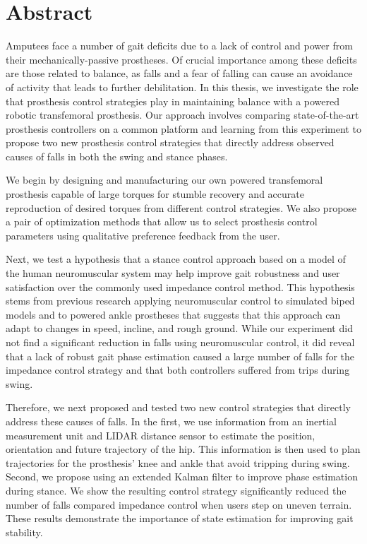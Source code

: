 \chapter*{Abstract}

Amputees face a number of gait deficits due to a lack of control and power from
their mechanically-passive prostheses. Of crucial importance among these
deficits are those related to balance, as falls and a fear of falling can cause
an avoidance of activity that leads to further debilitation. In this thesis, we
investigate the role that prosthesis control strategies play in maintaining
balance with a powered robotic transfemoral prosthesis. Our approach involves
comparing state-of-the-art prosthesis controllers on a common platform and
learning from this experiment to propose two new prosthesis control strategies
that directly address observed causes of falls in both the swing and stance
phases.

We begin by designing and manufacturing our own powered transfemoral prosthesis
capable of large torques for stumble recovery and accurate reproduction of
desired torques from different control strategies. We also propose a pair of
optimization methods that allow us to select prosthesis control parameters using
qualitative preference feedback from the user.

Next, we test a hypothesis that a stance control approach based on a model of
the human neuromuscular system may help improve gait robustness and user
satisfaction over the commonly used impedance control method. This hypothesis
stems from previous research applying neuromuscular control to simulated biped
models and to powered ankle prostheses that suggests that this approach can adapt
to changes in speed, incline, and rough ground. While our experiment did not
find a significant reduction in falls using neuromuscular control, it did reveal
that a lack of robust gait phase estimation caused a large number of falls for
the impedance control strategy and that both controllers suffered from trips
during swing.

Therefore, we next proposed and tested two new control strategies that directly
address these causes of falls. In the first, we use information from an inertial
measurement unit and LIDAR distance sensor to estimate the position, orientation
and future trajectory of the hip. This information is then used to plan
trajectories for the prosthesis' knee and ankle that avoid tripping during
swing. Second, we propose using an extended Kalman filter to improve phase
estimation during stance. We show the resulting control strategy significantly
reduced the number of falls compared impedance control when users step on uneven
terrain. These results demonstrate the importance of state estimation for
improving gait stability.
